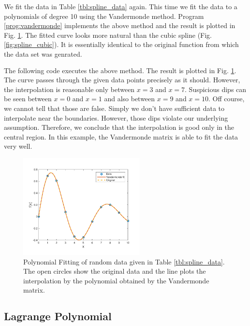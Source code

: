 \bigskip
\begin{example}\label{ex:Vandermonde}

We fit the data in Table \ref{tbl:spline_data} again.  This time we fit the data to a polynomials of degree 10 using the Vandermonde method.  Program \ref{prog:vandermonde} implements the above method and the result is plotted in Fig. \ref{fig:vandermonde}.  The fitted curve looks more natural than the cubic spline (Fig. \ref{fig:spline_cubic}).  It is essentially identical to the original function from which the data set was genrated.

\medskip
The following code executes the above method.  The result is plotted in Fig. \ref{fig:vandermonde}.  The curve passes through the given data points precisely as it should.  However, the interpolation is reasonable only between $x=3$ and $x=7$. Suspicious dips can be seen between $x=0$ and $x=1$ and also between $x=9$ and $x=10$.  Off course, we cannot tell that those are false.  Simply we don't have sufficient data to interpolate near the boundaries. However, those dips violate our underlying assumption.  Therefore, we conclude that the interpolation is good only in the central region.
In this example, the Vandermonde matrix is able to fit the data very well. 

\begin{figure}
\centering
\includegraphics[width=2.5in]{12.fitting/vandermonde.pdf}
\caption{Polynomial Fitting of random data given in Table \ref{tbl:spline_data}.  The open circles show the original data and the line plots the interpolation by the polynomial obtained by the Vandermonde matrix.}\label{fig:vandermonde}
\end{figure}
\end{example}


\noindent
\subsection{Lagrange Polynomial}

